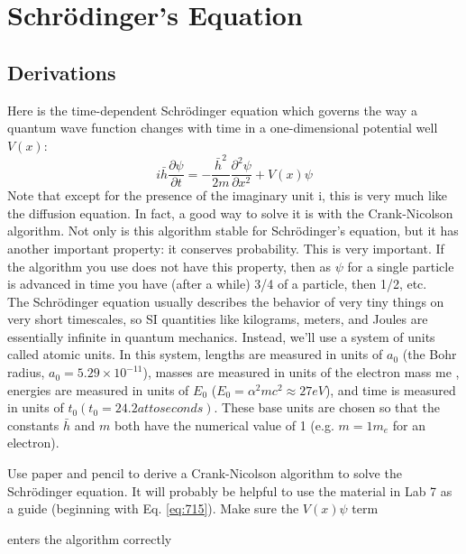 
\chapter*{Schr{\"o}dinger\rq s Equation}
\section*{Derivations}

Here is the time-dependent Schr{\"o}dinger equation which governs the way a quantum wave function changes with time in a one-dimensional potential well $V(x)$:
\begin{equation}\label{eq:81}
i \bar{h} \frac{\partial \psi}{\partial t}=-\frac{\bar{h}^{2}}{2 m} \frac{\partial^{2} \psi}{\partial x^{2}}+V(x) \psi
\end{equation}
Note that except for the presence of the imaginary unit i, this is very much like
the diffusion equation. In fact, a good way to solve it is with the Crank-Nicolson
algorithm. Not only is this algorithm stable for Schr{\"o}dinger\rq s equation, but it has
another important property: it conserves probability. This is very important. If
the algorithm you use does not have this property, then as $\psi$ for a single particle
is advanced in time you have (after a while) 3/4 of a particle, then 1/2, etc. \\
The Schr{\"o}dinger equation usually describes the behavior of very tiny things
on very short timescales, so SI quantities like kilograms, meters, and Joules are
essentially infinite in quantum mechanics. Instead, we\rq ll use a system of units
called atomic units. In this system, lengths are measured in units of $a_0$ (the Bohr
radius, $a_0 = 5.29×10^{−11}$), masses are measured in units of the electron mass me ,
energies are measured in units of $E_0$ ($E_0 = \alpha^2mc^2 \approx 27 eV$), and time is measured
in units of $t_0 (t_0 = 24.2 attoseconds)$. These base units are chosen so that the
constants $\bar{h}$ and $m$ both have the numerical value of 1 (e.g. $m = 1m_e$ for an electron).
\begin{problem}\label{P8.1}
Use paper and pencil to derive a Crank-Nicolson algorithm to solve the
Schr{\"o}dinger equation. It will probably be helpful to use the material in
Lab 7 as a guide (beginning with Eq. \eqref{eq:715}). Make sure the $V(x)\psi$ term\end{problem}
enters the algorithm correctly
